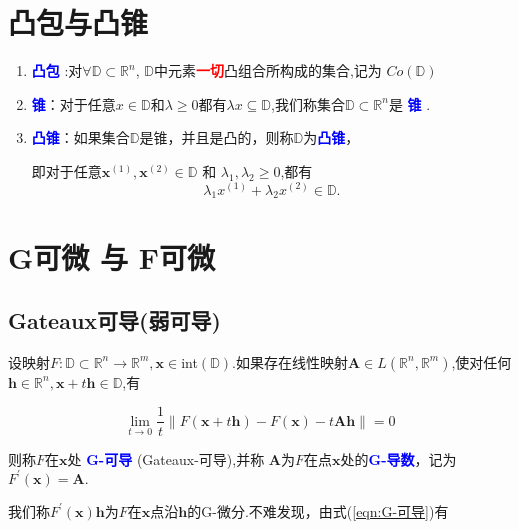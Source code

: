 \documentclass{lzureport}
\begin{document}
\section{凸包与凸锥}
\begin{enumerate}[label=\arabic*)]
	\item \textcolor{blue}{\textbf{凸包}} :对$\forall\mathbb{D}\subset\mathbb{R}^n$,  $\mathbb{D}$中元素\textcolor{red}{\textbf{一切}}\textcolor{YBXPurple}{凸组合所构成的集合},记为 $Co(\mathbb{D})$

	\item \textcolor{blue}{\textbf{锥}}：对于任意$x\in\mathbb{D}$和$\lambda\geqslant0$都有$\lambda x\subseteq \mathbb{D}$,我们称集合$\mathbb{D}\subset\mathbb{R}^n$是 \textcolor{blue}{\textbf{锥}} .
	
	\item \textcolor{blue}{\textbf{凸锥}}：如果集合$\mathbb{D}$是锥，并且是凸的，则称$\mathbb{D}$为\textcolor{blue}{\textbf{凸锥}}，
	
	即对于任意$\boldsymbol{x}^{(1)},\boldsymbol{x}^{(2)}\in\mathbb{D}$ 和 $\lambda_1,\lambda_2\geqslant0$,都有
	$$\lambda_1x^{(1)}+\lambda_2x^{(2)}\in\mathbb{D}.$$
\end{enumerate}


\section{G可微 与 F可微}
\subsection{Gateaux可导(弱可导)}
设映射$F:\mathbb{D}\subset\mathbb{R}^n\to\mathbb{R}^m,\boldsymbol{x}\in$int$(\mathbb{D}).$如果存在线性映射$\boldsymbol{A}\in L\left(\mathbb{R}^n,\mathbb{R}^m\right)$,使对任何$\boldsymbol{h}\in\mathbb{R}^n,\boldsymbol{x}+t\boldsymbol{h}\in\mathbb{D}$,有

\begin{equation}\label{eqn:G-可导}
\lim_{t\to0}\frac1t\|F(\boldsymbol{x}+t\boldsymbol{h})-F(\boldsymbol{x})-t\boldsymbol{Ah}\|=0
\end{equation}

则称$F$在$\boldsymbol x$处 \textcolor{blue}{\textbf{G-可导}} (Gateaux-可导),并称 \textcolor{YBXPurple}{$\boldsymbol A$为$F$在点$\boldsymbol x$处的}\textcolor{blue}{\textbf{G-导数}}，记为$F^\prime(\boldsymbol{x})=\boldsymbol{A}.$

我们称$F^\prime(\boldsymbol x)\boldsymbol{h}$为$F$在$\boldsymbol x$点沿$\boldsymbol h$的G-微分.不难发现，由式(\ref{eqn:G-可导})有
\end{document}
